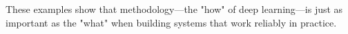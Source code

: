 These examples show that methodology—the "how" of deep learning—is just as important as the "what" when building systems that work reliably in practice.

